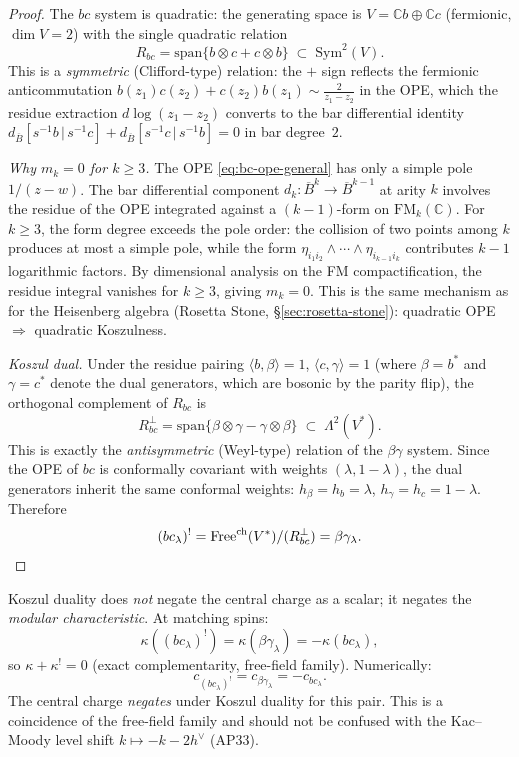 \documentclass[11pt]{article}
\newcommand{\barB}{\overline{B}}
\newcommand{\C}{\mathbb{C}}
\newcommand{\FM}{\mathrm{FM}}
\begin{document}
\begin{proof}
The $bc$ system is quadratic: the generating space is
$V = \C b \oplus \C c$ (fermionic, $\dim V = 2$) with
the single quadratic relation
\[
R_{bc} = \mathrm{span}\{b \otimes c + c \otimes b\}
\;\subset\; \mathrm{Sym}^2(V).
\]
This is a \emph{symmetric} (Clifford-type) relation: the
$+$ sign reflects the fermionic anticommutation $b(z_1)c(z_2)
+ c(z_2)b(z_1) \sim \frac{2}{z_1 - z_2}$ in the OPE, which
the residue extraction $d\log(z_1 - z_2)$ converts to the
bar differential identity $d_{\barB}[s^{-1}b \,|\, s^{-1}c]
+ d_{\barB}[s^{-1}c \,|\, s^{-1}b] = 0$ in bar degree~$2$.

\emph{Why $m_k = 0$ for $k \ge 3$.}  The OPE \eqref{eq:bc-ope-general}
has only a simple pole $1/(z{-}w)$.  The bar differential component
$d_k\colon \barB^k \to \barB^{k-1}$ at arity $k$ involves the
residue of the OPE integrated against a $(k{-}1)$-form on
$\FM_k(\C)$.  For $k \ge 3$, the form degree exceeds the pole
order: the collision of two points among $k$ produces at most a
simple pole, while the form $\eta_{i_1 i_2} \wedge \cdots \wedge
\eta_{i_{k-1} i_k}$ contributes $k{-}1$ logarithmic factors.
By dimensional analysis on the FM compactification, the residue
integral vanishes for $k \ge 3$, giving $m_k = 0$.  This is the
same mechanism as for the Heisenberg algebra (Rosetta Stone,
\S\ref{sec:rosetta-stone}): quadratic OPE $\Rightarrow$
quadratic Koszulness.

\emph{Koszul dual.}
Under the residue pairing $\langle b, \beta \rangle = 1$,
$\langle c, \gamma \rangle = 1$ (where $\beta = b^*$ and
$\gamma = c^*$ denote the dual generators, which are bosonic
by the parity flip), the orthogonal complement of $R_{bc}$ is
\[
R_{bc}^\perp = \mathrm{span}\{\beta \otimes \gamma - \gamma
\otimes \beta\} \;\subset\; \Lambda^2(V^*).
\]
This is exactly the \emph{antisymmetric} (Weyl-type) relation
of the $\beta\gamma$ system.  Since the OPE of $bc$ is
conformally covariant with weights $(\lambda, 1{-}\lambda)$,
the dual generators inherit the same conformal weights: $h_\beta
= h_b = \lambda$, $h_\gamma = h_c = 1 - \lambda$.  Therefore
\[
(bc_\lambda)^!
= \mathrm{Free}^{\mathrm{ch}}(V^*)/(R_{bc}^\perp)
= \beta\gamma_\lambda.
\qedhere
\]
\end{proof}

\begin{remark}
\label{rem:bc-kappa-koszul}
Koszul duality does \emph{not} negate the central charge
as a scalar; it negates the \emph{modular characteristic}.
At matching spins:
\[
\kappa((bc_\lambda)^!) = \kappa(\beta\gamma_\lambda)
= -\kappa(bc_\lambda),
\]
so $\kappa + \kappa^! = 0$ (exact complementarity, free-field
family).  Numerically:
\[
c_{(bc_\lambda)^!} = c_{\beta\gamma_\lambda}
= -c_{bc_\lambda}.
\]
The central charge \emph{negates} under Koszul duality for
this pair.  This is a coincidence of the free-field family
and should not be confused with the Kac--Moody level shift
$k \mapsto -k - 2h^\vee$ (AP33).
\end{remark}
\end{document}
